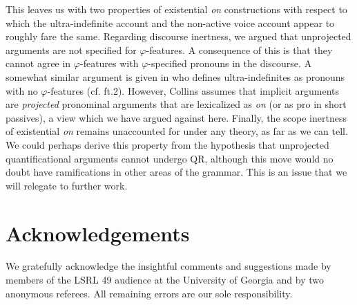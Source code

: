 \documentclass[output=paper,colorlinks,citecolor=brown]{langscibook}
\begin{document}
This leaves us with two properties of existential \textit{on} constructions with respect to which the ultra-indefinite account and the non-active voice account appear to roughly fare the same. Regarding discourse inertness, we argued that unprojected arguments are not specified for ${\varphi}${}-features. A consequence of this is that they cannot agree in ${\varphi}${}-features with ${\varphi}${}-specified pronouns in the discourse. A somewhat similar argument is given in \citet{collins2017a} who defines ultra-indefinites as pronouns with no ${\varphi}${}-features (cf. ft.2). However, Collins assumes that implicit arguments are \textit{projected} pronominal arguments that are lexicalized as \textit{on} (or as pro in short passives), a view which we have argued against here. Finally, the scope inertness of existential \textit{on} remains unaccounted for under any theory, as far as we can tell. We could perhaps derive this property from the hypothesis that unprojected quantificational arguments cannot undergo QR, although this move would no doubt have ramifications in other areas of the grammar. This is an issue that we will relegate to further work.


\section*{Acknowledgements}
  We gratefully acknowledge the insightful comments and suggestions made by members of the LSRL 49 audience at the University of Georgia and by two anonymous referees. All remaining errors are our sole responsibility.

\printbibliography[heading=subbibliography,notkeyword=this]
\end{document}
